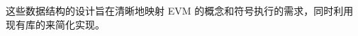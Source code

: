 \documentclass[print, master, vlined, timesmath]{DissertUESTC}
\begin{document}
这些数据结构的设计旨在清晰地映射 EVM 的概念和符号执行的需求，同时利用现有库的来简化实现。











\end{document}
